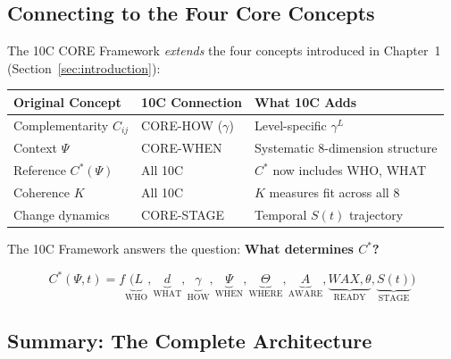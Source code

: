 \subsection{Connecting to the Four Core Concepts}
\label{sec:10c-connect}

The 10C CORE Framework \emph{extends} the four concepts introduced in
Chapter~1 (Section~\ref{sec:introduction}):

\begin{center}
\renewcommand{\arraystretch}{1.3}
\begin{tabular}{@{}lll@{}}
\toprule
\textbf{Original Concept} & \textbf{10C Connection} & \textbf{What 10C Adds} \\
\midrule
Complementarity $C_{ij}$ & CORE-HOW ($\gamma$) & Level-specific $\gamma^L$ \\
Context $\Psi$ & CORE-WHEN & Systematic 8-dimension structure \\
Reference $C^*(\Psi)$ & All 10C & $C^*$ now includes WHO, WHAT \\
Coherence $K$ & All 10C & $K$ measures fit across all 8 \\
Change dynamics & CORE-STAGE & Temporal $S(t)$ trajectory \\
\bottomrule
\end{tabular}
\end{center}

The 10C Framework answers the question: \textbf{What determines $C^*$?}

\begin{equation}
C^*(\Psi, t) = f\underbrace{(L}_{\text{WHO}}, \underbrace{d}_{\text{WHAT}}, \underbrace{\gamma}_{\text{HOW}}, \underbrace{\Psi}_{\text{WHEN}}, \underbrace{\Theta}_{\text{WHERE}}, \underbrace{A}_{\text{AWARE}}, \underbrace{WAX, \theta}_{\text{READY}}, \underbrace{S(t)}_{\text{STAGE}})
\end{equation}

\subsection{Summary: The Complete Architecture}
\label{sec:10c-summary}

